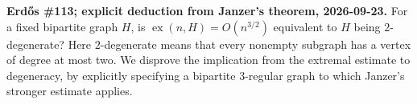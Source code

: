 \textbf{Erd\H{o}s \#113; explicit deduction from Janzer's theorem, 2026-09-23.}
For a fixed bipartite graph $H$, is $\operatorname{ex}(n,H)=O(n^{3/2})$ equivalent to $H$ being $2$-degenerate? Here $2$-degenerate means that every nonempty subgraph has a vertex of degree at most two. We disprove the implication from the extremal estimate to degeneracy, by explicitly specifying a bipartite $3$-regular graph to which Janzer's stronger estimate applies.
